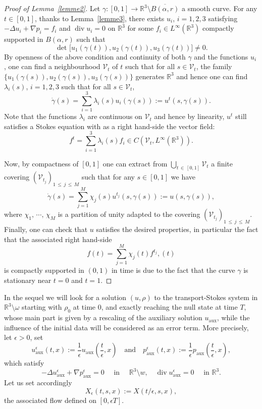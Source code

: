 \documentclass[10pt]{amsart}
\theoremstyle{definition}\newtheorem{defi}[theo]{Definition}\newtheorem{rema}[theo]{Remark}\newtheorem{exam}[theo]{Example}\newtheorem{exem}[theo]{Example}\newtheorem{nota}[theo]{Notation}
\newcommand{\aux}{\mathrm{aux}}
\newcommand{\R}{\mathbb{R}}
\newcommand{\clV}{\mathcal{V}}
\renewcommand{\leq}{\leqslant}
\renewcommand{\div}{\operatorname{div}}
\newcommand{\eps}{\epsilon}
\begin{document}
\begin{proof}[Proof of Lemma~\ref{lemme2}]
Let $\gamma : [0,1] \to \R^3 \setminus \overline{B(\alpha,r)}$ a smooth curve. For any $t \in [0,1]$, thanks to Lemma~\ref{lemme3}, there exists $u_i$, $i=1,2,3$ satisfying $ -\Delta u_i+\nabla p_i = f_i$ and $\div u_i=0$ on $\R^3$ for some $f_i \in L^\infty(\R^3) $ compactly supported in $B(\alpha,r)$ such that
\[
\text{ det } \big[u_1(\gamma(t)),u_2(\gamma(t)),u_3(\gamma(t)) \big] \neq 0.
\]
By openness of the above condition and continuity of both $\gamma$ and the functions $u_i$, one can find a neighbourhood $\clV_t$ of $t$ such that for all $s \in \clV_t$, the family $\{u_1(\gamma(s)),u_2(\gamma(s)),u_3(\gamma(s))\} $ generates $\R^3$ and hence one can find $\lambda_i(s)$, $i=1,2,3$ such that for all $s \in \clV_t$,
\[
\dot{\gamma}(s)=\underset{i=1}{\overset{3}{\sum}} \lambda_i(s) u_i(\gamma(s)) :=u^t(s,\gamma(s)).
\]
Note that the functions $\lambda_i$ are continuous on $\clV_t$ and hence by linearity, $u^t$ still satisfies a Stokes equation with as a right hand-side the vector field:
\[
f^t=\underset{i=1}{\overset{3}{\sum}} \lambda_i(s)f_i\in C\left(\clV_t,L^\infty\left(\R^3\right)\right).
\]

Now, by compactness of $[0,1]$ one can extract from $ {\bigcup}_{t\,\in\,[0,1]} \clV_t$ a finite covering $(\clV_{t_j})_{1\,\leq\,j\,\leq\,M}$ such that for any $s \in [0,1]$ we have
\[
\dot{\gamma}(s)=\underset{j=1}{\overset{M}{\sum}} \chi_j(s) u^{t_j}(s,\gamma(s)):=u(s,\gamma(s)),
\]
where $\chi_1,\,\cdots,\,\chi_M$ is a partition of unity adapted to the covering $(\clV_{t_j})_{1\,\leq\,j\,\leq\,M}$. Finally, one can check that $u$ satisfies the desired properties, in particular the fact that the associated right hand-side
\[
f(t)=\underset{j=1}{\overset{M}{\sum}} \chi_j(t) f^{t_j},(t)
\]
is compactly supported in $(0,1)$ in time is due to the fact that the curve $\gamma$ is stationary near $t=0$ and $t=1$.
\end{proof}



In the sequel we will look for a solution $ (u,\rho)$ to the transport-Stokes system in $\R^3 \setminus \omega$ starting with $\rho_0$ at time $0$, and exactly reaching the null state at time $T$, whose main part is given by a rescaling of the auxiliary solution $u_\aux$, while the influence of the initial data will be considered as an error term. More precisely, let $\eps>0$, set
\[
u^\eps_\aux(t,x):=\frac{1}{\eps}u_\aux\left(\frac{t}{\eps},x\right) \quad \text{and} \quad
p^\eps_\aux(t,x):=\frac{1}{\eps} p_\aux\left(\frac{t}{\eps},x\right),
\]
which satisfy
\begin{equation}\label{s*}
-\Delta u^\eps_\aux +\nabla p^\eps_\aux = 0 \quad \text{ in } \quad \R^3 \setminus w, \quad
\div u^\eps_\aux=0 \quad \text{ in }
\R^3.
\end{equation}
Let us set accordingly
\[
X_\eps(t,s,x):=X(t/\eps,s,x),
\]
the associated flow defined on $[0,\eps T]$.
\end{document}
